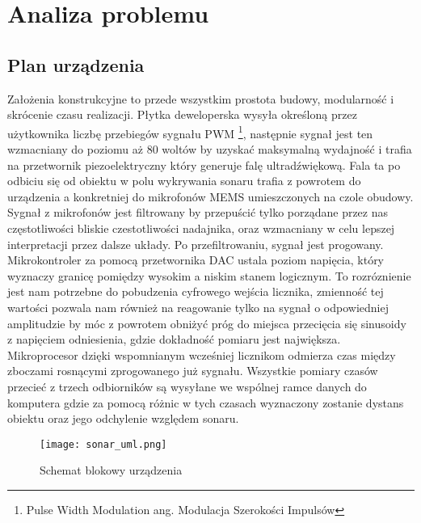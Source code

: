 \chapter[Analiza problemu]{Analiza problemu}

\label{analiza_problemu}



\section{Plan urządzenia}

Założenia konstrukcyjne to przede wszystkim prostota budowy, modularność i skrócenie czasu realizacji. 
Płytka deweloperska wysyła określoną przez użytkownika liczbę przebiegów sygnału PWM
\footnote[1]{Pulse Width Modulation ang. Modulacja Szerokości Impulsów}, następnie sygnał jest ten wzmacniany 
do poziomu aż 80 woltów by uzyskać maksymalną wydajność i trafia na przetwornik piezoelektryczny który generuje falę ultradźwiękową.
Fala ta po odbiciu się od obiektu w polu wykrywania sonaru trafia z powrotem do urządzenia a konkretniej do mikrofonów MEMS umieszczonych na czole obudowy.
Sygnał z mikrofonów jest filtrowany by przepuścić tylko porządane przez nas częstotliwości bliskie czestotliwości nadajnika, 
oraz wzmacniany w celu lepszej interpretacji przez dalsze układy.
Po przefiltrowaniu, sygnał jest progowany. Mikrokontroler za pomocą przetwornika DAC ustala poziom napięcia, 
który wyznaczy granicę pomiędzy wysokim a niskim stanem logicznym. To rozróznienie jest nam potrzebne do pobudzenia cyfrowego wejścia licznika, 
zmienność tej wartości pozwala nam również na reagowanie tylko na sygnał o odpowiedniej amplitudzie by móc z powrotem obniżyć próg 
do miejsca przecięcia się sinusoidy z napięciem odniesienia, gdzie dokładność pomiaru jest największa.
Mikroprocesor dzięki wspomnianym wcześniej licznikom odmierza czas między zboczami rosnącymi zprogowanego już sygnału.
Wszystkie pomiary czasów przecieć z trzech odbiorników są wysyłane we wspólnej ramce danych do komputera gdzie za pomocą 
różnic w tych czasach wyznaczony zostanie dystans obiektu oraz jego odchylenie względem sonaru.
\begin{figure}[ht!]
    \centering
    \texttt{[image: sonar\_uml.png]}
    \caption{Schemat blokowy urządzenia}
    \label{fig:uml}
\end{figure}



